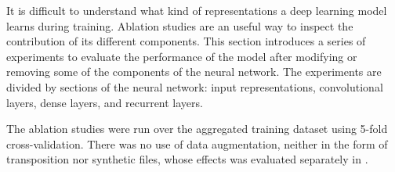 
It is difficult to understand what kind of representations a
deep learning model learns during training. Ablation studies
are an useful way to inspect the contribution of its
different components. This section introduces a series of
experiments to evaluate the performance of the model after
modifying or removing some of the components of the neural
network. The experiments are divided by sections of the
neural network: input representations, convolutional layers,
dense layers, and recurrent layers.

The ablation studies were run over the aggregated training
dataset using 5-fold cross-validation. There was no use of
data augmentation, neither in the form of transposition nor
synthetic files, whose effects was evaluated separately in
.
